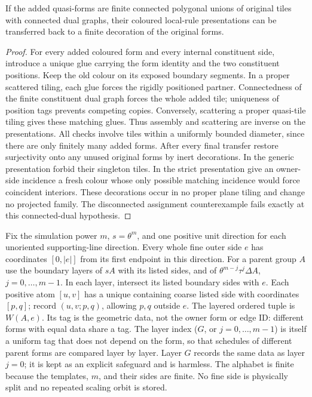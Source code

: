 \begin{lemma}\label{lem:glues}
If the added quasi-forms are finite connected polygonal unions of original
tiles with connected dual graphs, their coloured local-rule presentations
can be transferred back to a finite decoration of the original forms.
\end{lemma}
\begin{proof}
For every added coloured form and every internal constituent side,
introduce a unique glue carrying the form identity and the two constituent
positions. Keep the old colour on its exposed boundary segments.
In a proper scattered tiling, each glue forces the rigidly positioned
partner. Connectedness of the finite constituent dual graph forces the
whole added tile; uniqueness of position tags prevents competing copies.
Conversely, scattering a proper quasi-tile tiling gives these matching
glues. Thus assembly and scattering are inverse on the presentations.
All checks involve tiles within a uniformly bounded diameter, since there
are only finitely many added forms. After every final transfer restore
surjectivity onto any unused original forms by inert decorations. In the
generic presentation forbid their singleton tiles. In the strict
presentation give an owner-side incidence a fresh colour whose only possible
matching incidence would force coincident interiors. These decorations
occur in no proper plane tiling and change no projected family.
The disconnected assignment counterexample fails exactly at this
connected-dual hypothesis.
\end{proof}

\begin{definition}\label{def:endpoint-schedule}
Fix the simulation power $m$, $s=\theta^m$, and one positive unit direction
for each unoriented supporting-line direction. Every whole fine outer side
$e$ has coordinates $[0,|e|]$ from its first endpoint in this direction.
For a parent group $A$ use the boundary layers of $sA$ with its listed sides,
and of $\theta^{m-j}\tau^j\Delta A$, $j=0,\ldots,m-1$.
In each layer, intersect its listed boundary sides with $e$. Each positive
atom $[u,v]$ has a unique containing coarse listed side with coordinates
$[p,q]$; record $(u,v;p,q)$, allowing $p,q$ outside $e$.
The layered ordered tuple is $W(A,e)$. Its tag is the geometric data,
not the owner form or edge ID: different forms with equal data share a tag.
The layer index ($G$, or $j=0,\ldots,m-1$) is itself a uniform tag that
does not depend on the form, so that schedules of different parent forms
are compared layer by layer. Layer $G$ records the same data as layer
$j=0$; it is kept as an explicit safeguard and is harmless.
The alphabet is finite because the templates, $m$, and their sides are finite.
No fine side is physically split and no repeated scaling orbit is stored.
\end{definition}

